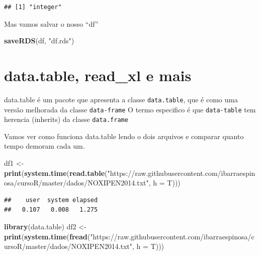 \documentclass[]{book}
\newenvironment{Shaded}{\begin{snugshade}}{\end{snugshade}}
\newcommand{\KeywordTok}[1]{\textcolor[rgb]{0.13,0.29,0.53}{\textbf{#1}}}
\newcommand{\DataTypeTok}[1]{\textcolor[rgb]{0.13,0.29,0.53}{#1}}
\newcommand{\StringTok}[1]{\textcolor[rgb]{0.31,0.60,0.02}{#1}}
\newcommand{\NormalTok}[1]{#1}
\begin{document}
\begin{verbatim}
## [1] "integer"
\end{verbatim}

Mas vamos salvar o nosso ``df''

\begin{Shaded}
\begin{Highlighting}[]
\KeywordTok{saveRDS}\NormalTok{(df, }\StringTok{"df.rds"}\NormalTok{)}
\end{Highlighting}
\end{Shaded}

\section{data.table, read\_xl e mais}\label{data.table-read_xl-e-mais}

data.table é um pacote que apresenta a classe \texttt{data.table}, que é
como uma versão melhorada da classe \texttt{data-frame} O termo
especifico é que \texttt{data-table} tem herencia (inherits) da classe
\texttt{data.frame}

Vamos ver como funciona data.table lendo o dois arquivos e comparar
quanto tempo demoram cada um.

\begin{Shaded}
\begin{Highlighting}[]
\NormalTok{df1 <-}\StringTok{ }\KeywordTok{print}\NormalTok{(}\KeywordTok{system.time}\NormalTok{(}\KeywordTok{read.table}\NormalTok{(}\StringTok{"https://raw.githubusercontent.com/ibarraespinosa/cursoR/master/dados/NOXIPEN2014.txt"}\NormalTok{, }\DataTypeTok{h =}\NormalTok{ T)))}
\end{Highlighting}
\end{Shaded}

\begin{verbatim}
##    user  system elapsed 
##   0.107   0.008   1.275
\end{verbatim}

\begin{Shaded}
\begin{Highlighting}[]
\KeywordTok{library}\NormalTok{(data.table)}
\NormalTok{df2 <-}\StringTok{ }\KeywordTok{print}\NormalTok{(}\KeywordTok{system.time}\NormalTok{(}\KeywordTok{fread}\NormalTok{(}\StringTok{"https://raw.githubusercontent.com/ibarraespinosa/cursoR/master/dados/NOXIPEN2014.txt"}\NormalTok{, }\DataTypeTok{h =}\NormalTok{ T)))}
\end{Highlighting}
\end{Shaded}
\end{document}
